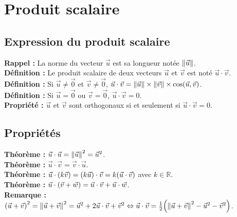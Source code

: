 \documentclass[a4paper,titlepage]{article}
\let\oldsection\section
\renewcommand\section{\clearpage\oldsection}
\let\oldleft\left
\renewcommand{\left}{\mathopen{}\mathclose\bgroup\oldleft}
\let\oldright\right
\renewcommand{\right}{\aftergroup\egroup\oldright}
\begin{document}
\section{Produit scalaire}
    \subsection{Expression du produit scalaire}
        \textbf{Rappel :} La norme du vecteur $\vec{u}$ est sa longueur notée $\left\|\vec{u}\right\|$.
        \\
        \textbf{Définition :} Le produit scalaire de deux vecteurs $\vec{u}$ et $\vec{v}$ est noté $\vec{u}\cdot\vec{v}$.
        \\
        \textbf{Définition :} Si $\vec{u}\neq\overrightarrow{0}$ et $\vec{v}\neq\overrightarrow{0}$, $\vec{u}\cdot\vec{v}=\left\|\vec{u}\right\|\times\left\|\vec{v}\right\|\times\cos\left(\vec{u},\vec{v}\right)$.
        \\
        \textbf{Définition :} Si $\vec{u}=\overrightarrow{0}$ ou $\vec{v}=\overrightarrow{0}$, $\vec{u}\cdot\vec{v}=0$.
        \\
        \textbf{Propriété :} $\vec{u}$ et $\vec{v}$ sont orthogonaux si et seulement si $\vec{u}\cdot\vec{v}=0$.
    \subsection{Propriétés}
        \textbf{Théorème :} $\vec{u}\cdot\vec{u}=\left\|\vec{u}\right\|^{2}=\vec{u}^{2}$.
        \\
        \textbf{Théorème :} $\vec{u}\cdot\vec{v}=\vec{v}\cdot\vec{u}$.
        \\
        \textbf{Théorème :} $\vec{u}\cdot\left(k\vec{v}\right)=\left(k\vec{u}\right)\cdot\vec{v}=k\left(\vec{u}\cdot\vec{v}\right)$ avec $k\in\mathbb{R}$.
        \\
        \textbf{Théorème :} $\vec{u}\cdot\left(\vec{v}+\vec{w}\right)=\vec{u}\cdot\vec{v}+\vec{u}\cdot\vec{w}$.
        \\
        \textbf{Remarque :} $\left(\vec{u}+\vec{v}\right)^{2}=\left\|\vec{u}+\vec{v}\right\|^{2}=\vec{u}^{2}+2\vec{u}\cdot\vec{v}+\vec{v}^{2}\Leftrightarrow\vec{u}\cdot\vec{v}=\frac{1}{2}\left(\left\|\vec{u}+\vec{v}\right\|^{2}-\vec{u}^{2}-\vec{v}^{2}\right)$.
\end{document}
